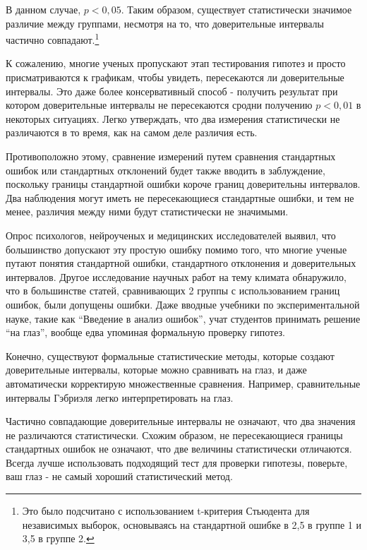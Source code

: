 В данном случае, $p < 0,05$. Таким образом, существует статистически значимое различие между группами, несмотря на то, что доверительные интервалы частично совпадают.\footnote{Это было подсчитано с использованием t-критерия Стьюдента для независимых выборок, основываясь на стандартной ошибке в 2,5 в группе 1 и 3,5 в группе 2.}

К сожалению, многие ученых пропускают этап тестирования гипотез и просто присматриваются к графикам, чтобы увидеть, пересекаются ли доверительные интервалы. Это даже более консервативный способ - получить результат при котором доверительные интервалы не пересекаются сродни получению $p < 0,01$ в некоторых ситуациях.\cite{schenker_judging_2001} Легко утверждать, что два измерения статистически не различаются в то время, как на самом деле различия есть.  

Противоположно этому, сравнение измерений путем сравнения стандартных ошибок или стандартных отклонений будет также вводить в заблуждение, поскольку границы стандартной ошибки короче границ доверительны интервалов. Два наблюдения могут иметь не пересекающиеся стандартные ошибки, и тем не менее, различия между ними будут статистически не значимыми.

Опрос психологов, нейроученых и медицинских исследователей выявил, что большинство допускают эту простую ошибку помимо того, что многие ученые путают понятия стандартной ошибки, стандартного отклонения и доверительных интервалов. \cite{belia_researchers_2005} Другое исследование научных работ на тему климата обнаружило, что в большинстве статей, сравнивающих 2 группы с использованием границ ошибок, были допущены ошибки.\cite{lanzante_cautionary_2005} Даже вводные учебники по экспериментальной науке, такие как ``Введение в анализ ошибок'', учат студентов принимать решение ``на глаз'', вообще едва упоминая формальную проверку гипотез.   

Конечно, существуют формальные статистические методы, которые создают доверительные интервалы, которые можно сравнивать на глаз, и даже автоматически корректирую множественные сравнения. Например, сравнительные интервалы Гэбриэля легко интерпретировать на глаз. \cite{gabriel_simple_1978}

Частично совпадающие доверительные интервалы не означают, что два значения не различаются статистически. Схожим образом, не пересекающиеся границы стандартных ошибок не означают, что две величины статистически отличаются. Всегда лучше использовать подходящий тест для проверки гипотезы, поверьте, ваш глаз - не самый хороший статистический метод. 